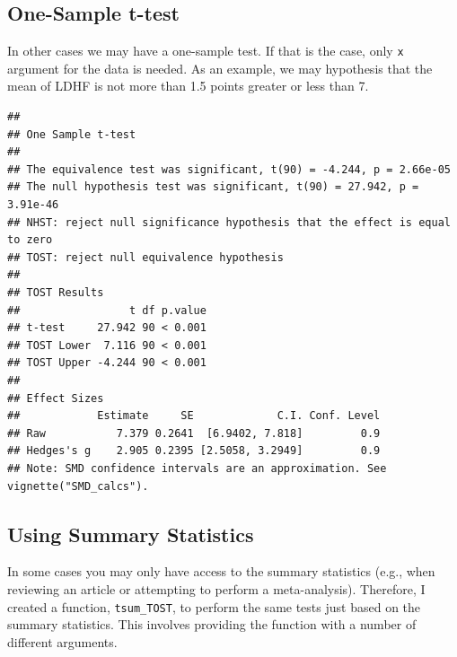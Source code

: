 \documentclass[]{interact}
\theoremstyle{plain}%
\theoremstyle{definition}
\theoremstyle{remark}
\newenvironment{Shaded}{\begin{snugshade}}{\end{snugshade}}
\newcommand{\AttributeTok}[1]{\textcolor[rgb]{0.77,0.63,0.00}{#1}}
\newcommand{\FloatTok}[1]{\textcolor[rgb]{0.00,0.00,0.81}{#1}}
\newcommand{\FunctionTok}[1]{\textcolor[rgb]{0.00,0.00,0.00}{#1}}
\newcommand{\NormalTok}[1]{#1}
\newcommand{\OtherTok}[1]{\textcolor[rgb]{0.56,0.35,0.01}{#1}}
\newcommand{\SpecialCharTok}[1]{\textcolor[rgb]{0.00,0.00,0.00}{#1}}
\newcommand{\StringTok}[1]{\textcolor[rgb]{0.31,0.60,0.02}{#1}}
\begin{document}
\newpage

\hypertarget{one-sample-t-test}{%
\subsection{One-Sample t-test}\label{one-sample-t-test}}

In other cases we may have a one-sample test. If that is the case, only
\texttt{x} argument for the data is needed. As an example, we may
hypothesis that the mean of LDHF is not more than 1.5 points greater or
less than 7.

\begin{Shaded}
\end{Shaded}

\begin{verbatim}
## 
## One Sample t-test
## 
## The equivalence test was significant, t(90) = -4.244, p = 2.66e-05
## The null hypothesis test was significant, t(90) = 27.942, p = 3.91e-46
## NHST: reject null significance hypothesis that the effect is equal to zero 
## TOST: reject null equivalence hypothesis
## 
## TOST Results 
##                 t df p.value
## t-test     27.942 90 < 0.001
## TOST Lower  7.116 90 < 0.001
## TOST Upper -4.244 90 < 0.001
## 
## Effect Sizes 
##            Estimate     SE             C.I. Conf. Level
## Raw           7.379 0.2641  [6.9402, 7.818]         0.9
## Hedges's g    2.905 0.2395 [2.5058, 3.2949]         0.9
## Note: SMD confidence intervals are an approximation. See vignette("SMD_calcs").
\end{verbatim}

\newpage

\hypertarget{using-summary-statistics}{%
\subsection{Using Summary Statistics}\label{using-summary-statistics}}

In some cases you may only have access to the summary statistics (e.g.,
when reviewing an article or attempting to perform a meta-analysis).
Therefore, I created a function, \texttt{tsum\_TOST}, to perform the
same tests just based on the summary statistics. This involves providing
the function with a number of different arguments.
\end{document}
